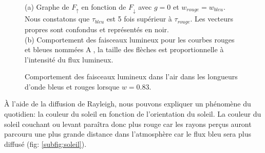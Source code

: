 \documentclass[12pt]{article}
\begin{document}
\begin{figure}[H]
\begin{subfigure}{0.325\textwidth}
        \caption{}
        \label{subfig:schéma.bleu_rouge}
    \end{subfigure}
    \caption{Comportement des faisceaux lumineux dans l'air dans les longueurs d'onde bleus et rouges lorsque $w=0.83$.}
    \label{fig:air}
    \noindent \justifying
    (a) Graphe de $F_{\uparrow}$ en fonction de $F_{\downarrow}$ avec $g=0$ et $w_{rouge}=w_{bleu}$. Nous constatons que $\tau_{bleu}$ est 5 fois supérieur à $\tau_{rouge}$.
    Les vecteurs propres sont confondus et représentés en noir.\\(b) Comportement des faisceaux lumineux pour les courbes rouges et bleues nommées \textcircled{\small A}, la taille des flèches est proportionnelle à l'intensité du flux lumineux.
\end{figure}






À l'aide de la diffusion de Rayleigh, nous pouvons expliquer un phénomène du quotidien: la couleur du soleil en fonction de l'orientation du soleil.
La couleur du soleil couchant ou levant paraîtra donc plus rouge car les rayons perçus auront parcouru une plus grande distance dans l'atmosphère car le flux bleu sera plus diffusé (fig: \ref{subfig:soleil}).
\end{document}
